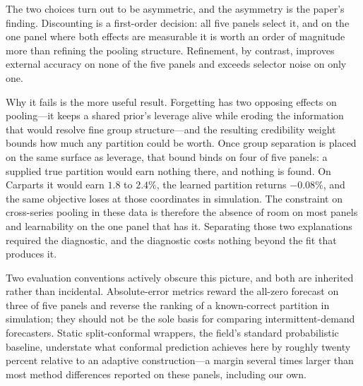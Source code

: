 \documentclass[twocolumn,10pt]{article}
\theoremstyle{definition}
\begin{document}
The two choices turn out to be asymmetric, and the asymmetry is the
paper's finding. Discounting is a first-order decision: all five panels
select it, and on the one panel where both effects are measurable it is
worth an order of magnitude more than refining the pooling structure.
Refinement, by contrast, improves external accuracy on none of the five
panels and exceeds selector noise on only one.

Why it fails is the more useful result. Forgetting has two opposing
effects on pooling---it keeps a shared prior's leverage alive while
eroding the information that would resolve fine group structure---and the
resulting credibility weight bounds how much any partition could be worth.
Once group separation is placed on the same surface as leverage, that
bound binds on four of five panels: a supplied true partition would earn
nothing there, and nothing is found. On Carparts it would earn $1.8$ to
$2.4\%$, the learned partition returns $-0.08\%$, and the same objective
loses at those coordinates in simulation. The constraint on cross-series
pooling in these data is therefore the absence of room on most panels and
learnability on the one panel that has it. Separating those two
explanations required the diagnostic, and the diagnostic costs nothing
beyond the fit that produces it.

Two evaluation conventions actively obscure this picture, and both are
inherited rather than incidental. Absolute-error metrics reward the
all-zero forecast on three of five panels and reverse the ranking of a
known-correct partition in simulation; they should not be the sole basis
for comparing intermittent-demand forecasters. Static split-conformal
wrappers, the field's standard probabilistic baseline, understate what
conformal prediction achieves here by roughly twenty percent relative to
an adaptive construction---a margin several times larger than most method
differences reported on these panels, including our own.
\end{document}

